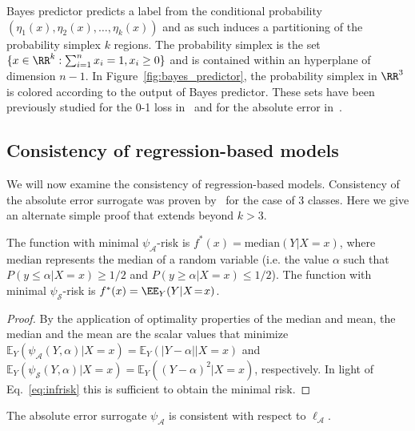 Bayes predictor predicts a label from the conditional probability $(\eta_1(x), \eta_2(x), \ldots, \eta_k(x))$ and as such induces a partitioning of the probability simplex $k$ regions. The probability simplex is the set $\{x \in \RR^k: \sum_{i=1}^n x_i = 1, x_i \geq 0\}$ and is contained within an hyperplane of dimension $n-1$. In Figure~\ref{fig:bayes_predictor}, the probability simplex in $\RR^3$ is colored according to the output of Bayes predictor. These sets have been previously studied for the 0-1 loss in~\citep{o2008cost} and for the absolute error in~\citep{Ramaswamy2012}.




\subsection{Consistency of regression-based models}\label{subsec:regression-based}

We will now examine the consistency of regression-based models. Consistency of the absolute error surrogate was proven by~\citep{Ramaswamy2012} for the case of 3 classes. Here we give an alternate simple proof that extends beyond $k>3$.

\begin{lemma}
The function with minimal $\psi_{\mathcal{A}}$-risk is $f^*(x) = \mathrm{median}(Y|X\!=\!x)$, where $\mathrm{median}$ represents the median of a random variable (i.e. the value $\alpha$ such that $P(y \leq \alpha|X\!=\!x) \geq 1/2$ and $P(y \geq \alpha|X\!=\!x) \leq 1/2$). The function with minimal \mbox{$\psi_{\mathcal{S}}$-risk} is $f^*(x) = \EE_Y(Y|X\!=\!x)$.
\end{lemma}
\begin{proof} By the application of optimality properties of the median and mean, the median and the mean are the scalar values that minimize
$\mathbb{E}_Y(\psi_{\mathcal{A}}(Y, \alpha)|X\!=\!x) = \mathbb{E}_Y(|Y - \alpha||X\!=\!x)$ and $\mathbb{E}_Y(\psi_{\mathcal{S}}(Y, \alpha)|X\!=\!x) = \mathbb{E}_Y((Y - \alpha)^2|X\!=\!x)$, respectively. In light of Eq.~\eqref{eq:infrisk} this is sufficient to obtain the minimal risk.
\end{proof}

\begin{theorem}\label{thm:consistent_absolute}
The absolute error surrogate $\psi_{\mathcal{A}}$ is consistent with respect to $\ell_{\mathcal{A}}$.
\end{theorem}

